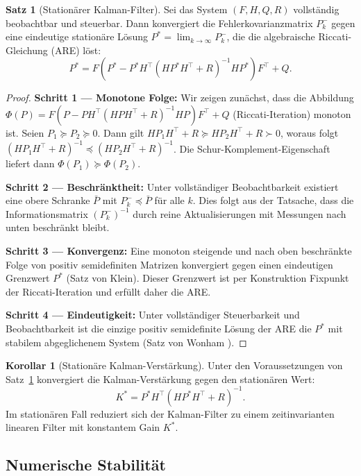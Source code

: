 ﻿\documentclass[a4paper,12pt]{article}
\theoremstyle{definition}
\newtheorem{satz}{Satz}
\newtheorem{korollar}{Korollar}
\begin{document}
\begin{satz}[Stationärer Kalman-Filter]
\label{satz:stationaer}
    Sei das System $(F, H, Q, R)$ vollständig beobachtbar und steuerbar.
    Dann konvergiert die Fehlerkovarianzmatrix $P_k^-$ gegen eine eindeutige
    stationäre Lösung $P^* = \lim_{k\to\infty} P_k^-$, die die algebraische
    Riccati-Gleichung (ARE) löst:
    \[
        P^* = F\left(P^* - P^* H^\top (H P^* H^\top + R)^{-1} H P^*\right) F^\top + Q.
    \]
\end{satz}

\begin{proof}
\textbf{Schritt 1 --- Monotone Folge:}
Wir zeigen zunächst, dass die Abbildung
$\Phi(P) = F(P - P H^\top(H P H^\top + R)^{-1} H P)F^\top + Q$
(Riccati-Iteration) monoton ist. Seien $P_1 \succeq P_2 \succeq 0$. Dann gilt
$H P_1 H^\top + R \succeq H P_2 H^\top + R \succ 0$, woraus folgt
$(H P_1 H^\top + R)^{-1} \preceq (H P_2 H^\top + R)^{-1}$.
Die Schur-Komplement-Eigenschaft liefert dann $\Phi(P_1) \succeq \Phi(P_2)$.

\textbf{Schritt 2 --- Beschränktheit:}
Unter vollständiger Beobachtbarkeit existiert eine obere Schranke $\bar{P}$ mit
$P_k^- \preceq \bar{P}$ für alle $k$. Dies folgt aus der Tatsache, dass die
Informationsmatrix $(P_k^-)^{-1}$ durch reine Aktualisierungen mit Messungen
nach unten beschränkt bleibt.

\textbf{Schritt 3 --- Konvergenz:}
Eine monoton steigende und nach oben beschränkte Folge von positiv semidefiniten
Matrizen konvergiert gegen einen eindeutigen Grenzwert $P^*$ (Satz von Klein).
Dieser Grenzwert ist per Konstruktion Fixpunkt der Riccati-Iteration und erfüllt
daher die ARE.

\textbf{Schritt 4 --- Eindeutigkeit:}
Unter vollständiger Steuerbarkeit und Beobachtbarkeit ist die einzige
positiv semidefinite Lösung der ARE die $P^*$ mit stabilem abgeglichenem System
(Satz von Wonham \cite{wonham1968}).
\end{proof}

\begin{korollar}[Stationäre Kalman-Verstärkung]
    Unter den Voraussetzungen von Satz~\ref{satz:stationaer} konvergiert die
    Kalman-Verstärkung gegen den stationären Wert:
    \[
        K^* = P^* H^\top (H P^* H^\top + R)^{-1}.
    \]
    Im stationären Fall reduziert sich der Kalman-Filter zu einem zeitinvarianten
    linearen Filter mit konstantem Gain $K^*$.
\end{korollar}

\subsection{Numerische Stabilität}
\end{document}
